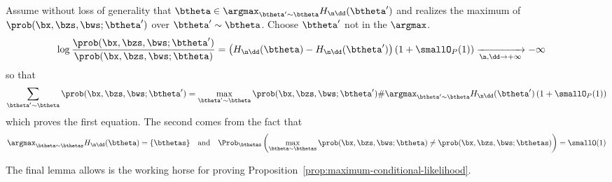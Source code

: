 Assume without loss of generality that $\btheta \in \argmax_{\btheta' \sim \btheta} H_{\n\dd}(\btheta')$ and realizes the maximum of $\prob(\bx, \bzs, \bws; \btheta')$ over $\btheta' \sim \btheta$. Choose $\btheta'$ not in the $\argmax$. 
\begin{align*}
\log \frac{\prob(\bx, \bzs, \bws; \btheta')}{\prob(\bx, \bzs, \bws; \btheta)} & = \left( H_{\n\dd}(\btheta) - H_{\n\dd}(\btheta') \right) (1 + \smallO_P(1)) \xrightarrow[\n,\dd \to +\infty]{} -\infty
\end{align*}
so that 
\begin{align*}
  \sum_{\btheta' \sim \btheta} \prob(\bx, \bzs, \bws; \btheta') = \max_{\btheta' \sim \btheta} \prob(\bx, \bzs, \bws; \btheta') \# \argmax_{\btheta' \sim \btheta} H_{\n\dd}(\btheta') \left(1 + \smallO_P(1) \right)
\end{align*}
which proves the first equation. The second comes from the fact that 
\begin{equation*}
  \argmax_{\btheta \sim \bthetas} H_{\n\dd}(\btheta) = \{ \bthetas \} \quad \text{and} \quad \Prob_{\bthetas}\left( \max_{\btheta \sim \bthetas} \prob(\bx, \bzs, \bws; \btheta) \neq \prob(\bx, \bzs, \bws; \bthetas) \right) = \smallO(1)
\end{equation*}
\proofend

The final lemma allows is the working horse for proving Proposition~\ref{prop:maximum-conditional-likelihood}. 

